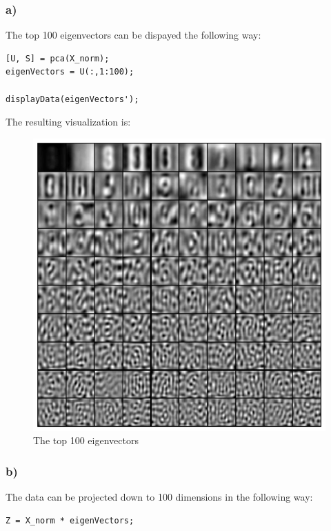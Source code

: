 \subsubsection{a)}

The top 100 eigenvectors can be dispayed the following way:

\begin{lstlisting}[caption=Problem 3.7 a)]
[U, S] = pca(X_norm);
eigenVectors = U(:,1:100);

displayData(eigenVectors');
\end{lstlisting}

The resulting visualization is:

\newpage

\begin{figure}[!ht]
\includegraphics[width=1\textwidth]{chapters/images/figure-3-7-b}
\caption{The top 100 eigenvectors}
\end{figure}


\subsubsection{b)}

The data can be projected down to 100 dimensions in the following way:

\begin{lstlisting}[caption=Problem 3.7 b)]
Z = X_norm * eigenVectors;
\end{lstlisting}


